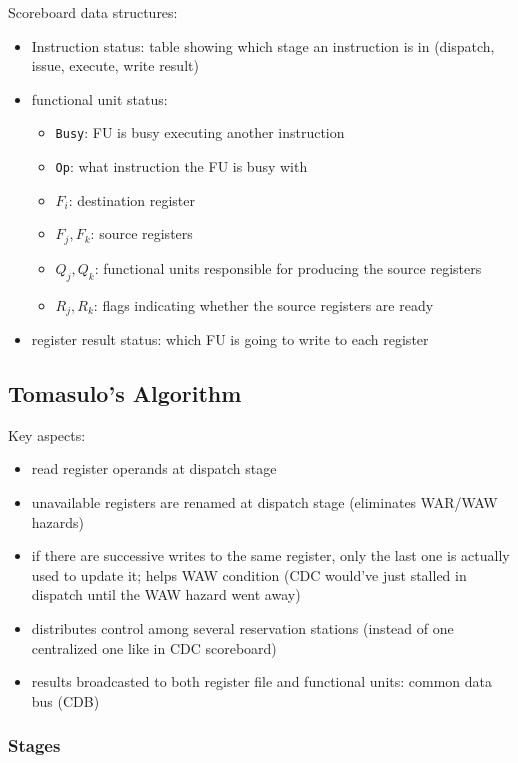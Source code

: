 \documentclass[12pt]{extarticle}
\begin{document}
	\noindent Scoreboard data structures:

	\begin{itemize}
		\item Instruction status: table showing which stage an instruction is in (dispatch, issue, execute, write result)
		\item functional unit status:
		\begin{itemize}
			\item \texttt{Busy}: FU is busy executing another instruction
			\item \texttt{Op}: what instruction the FU is busy with
			\item $F_i$: destination register
			\item $F_j, F_k$: source registers
			\item $Q_j, Q_k$: functional units responsible for producing the source registers
			\item $R_j, R_k$: flags indicating whether the source registers are ready
		\end{itemize}

		\item register result status: which FU is going to write to each register
	\end{itemize}

	\subsection{Tomasulo's Algorithm}

	Key aspects:

	\begin{itemize}
		\item read register operands at dispatch stage
		\item unavailable registers are renamed at dispatch stage (eliminates WAR/WAW hazards)
		\item if there are successive writes to the same register, only the last one is actually used to update it; helps 
		WAW condition (CDC would've just stalled in dispatch until the WAW hazard went away)
		\item distributes control among several reservation stations (instead of one centralized one like in CDC scoreboard)
		\item results broadcasted to both register file and functional units: common data bus (CDB)
	\end{itemize}

	\subsubsection{Stages}
\end{document}
